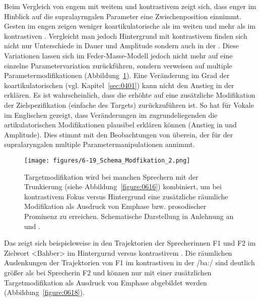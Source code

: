 Beim Vergleich von engem  mit weitem und kontrastivem  zeigt sich, dass enger  im Hinblick auf die supralayrngalen Parameter eine Zwischenposition einnimmt. Gesten im engen  zeigen weniger koartikulatorische  als im weiten  und mehr als im kontrastiven . Vergleicht man jedoch Hintergrund mit kontrastivem  finden sich nicht nur Unterschiede in Dauer und Amplitude sondern auch in der . Diese Variationen lassen sich im Feder-Masse-Modell jedoch nicht mehr auf eine einzelne Parametervariation zurückführen, sondern verweisen auf multiple Parametermodifikationen (Abbildung~\ref{figure:0617}). Eine Veränderung im Grad der koartikulatorischen  (vgl. Kapitel~\ref{sec:0401}) kann nicht den Anstieg in der  erklären. Es ist wahrscheinlich, dass die erhöhte  auf eine zusätzliche Modifikation der Zielspezifikation (einfache  des Targets) zurückzuführen ist. So hat \citet{DeJong1995} für Vokale im Englischen gezeigt, dass Veränderungen im zugrundeliegenden  die artikulatorischen Modifikationen plausibel erklären können (Anstieg in  und Amplitude). Dies stimmt mit den Beobachtungen von \citet{Cho2006} überein, der für  der supralaryngalen  multiple Parametermanipulationen annimmt.

\begin{figure} 
	\texttt{[image: figures/6-19\_Schema\_Modfikation\_2.png]}
	\caption{Targetmodifikation wird bei manchen Sprechern mit der Trunkierung (siehe Abbildung~\ref{figure:0616}) kombiniert, um bei kontrastivem Fokus versus Hintergrund eine zusätzliche räumliche Modifikation als Ausdruck von Emphase bzw. prosodischer Prominenz zu erreichen. Schematische Darstellung in Anlehnung an \citealt[71]{Beckman1992} und \citealt[17]{Cho2002a}.}
	\label{figure:0617}
\end{figure}


Das zeigt sich beispielsweise in den Trajektorien der Sprecherinnen F1 und F2 im Zielwort  <Bahber> im Hintergurnd versus kontrastivem . Die räumlichen Auslenkungen der Trajektorien von F1 im kontrastiven  in der  /ba:/ sind deutlich größer als bei Sprecherin F2 und können nur mit einer zusätzlichen Targetmodifikation als Ausdruck von Emphase abgebildet werden (Abbildung~\ref{figure:0618}).


